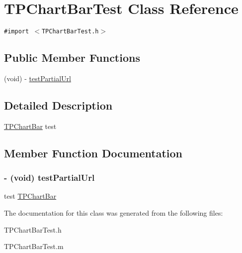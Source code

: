 \hypertarget{interface_t_p_chart_bar_test}{
\section{TPChartBarTest Class Reference}
\label{interface_t_p_chart_bar_test}
}
{\tt \#import $<$TPChartBarTest.h$>$}

\subsection*{Public Member Functions}
\begin{CompactItemize}
\item 
(void) - \hyperlink{interface_t_p_chart_bar_test_408ce0fe14b71e55aafa24a984c30a6b}{testPartialUrl}
\end{CompactItemize}


\subsection{Detailed Description}
\hyperlink{interface_t_p_chart_bar}{TPChartBar} test 

\subsection{Member Function Documentation}
\hypertarget{interface_t_p_chart_bar_test_408ce0fe14b71e55aafa24a984c30a6b}{
\subsubsection[{testPartialUrl}]{\setlength{\rightskip}{0pt plus 5cm}- (void) testPartialUrl }}
\label{interface_t_p_chart_bar_test_408ce0fe14b71e55aafa24a984c30a6b}


test \hyperlink{interface_t_p_chart_bar}{TPChartBar} 

The documentation for this class was generated from the following files:\begin{CompactItemize}
\item 
TPChartBarTest.h\item 
TPChartBarTest.m\end{CompactItemize}
